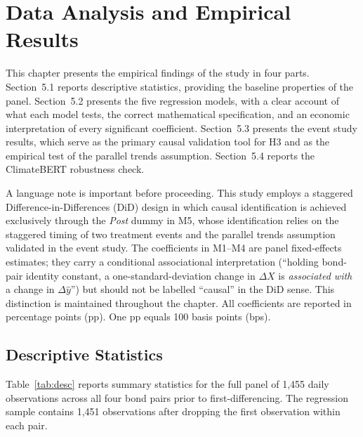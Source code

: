 \documentclass[12pt,a4paper]{article}
\begin{document}

\setcounter{section}{4}
\section{Data Analysis and Empirical Results}

This chapter presents the empirical findings of the study in four parts. Section~5.1 reports descriptive statistics, providing the baseline properties of the panel. Section~5.2 presents the five regression models, with a clear account of what each model tests, the correct mathematical specification, and an economic interpretation of every significant coefficient. Section~5.3 presents the event study results, which serve as the primary causal validation tool for H3 and as the empirical test of the parallel trends assumption. Section~5.4 reports the ClimateBERT robustness check.

A language note is important before proceeding. This study employs a staggered Difference-in-Differences (DiD) design in which causal identification is achieved exclusively through the \textit{Post} dummy in M5, whose identification relies on the staggered timing of two treatment events and the parallel trends assumption validated in the event study. The coefficients in M1--M4 are panel fixed-effects estimates; they carry a conditional associational interpretation (``holding bond-pair identity constant, a one-standard-deviation change in $\Delta X$ is \textit{associated with} a change in $\Delta\hat{y}$'') but should not be labelled ``causal'' in the DiD sense. This distinction is maintained throughout the chapter. All coefficients are reported in percentage points (pp). One pp equals 100 basis points (bps).

\subsection{Descriptive Statistics}

Table~\ref{tab:desc} reports summary statistics for the full panel of 1,455 daily observations across all four bond pairs prior to first-differencing. The regression sample contains 1,451 observations after dropping the first observation within each pair.
\end{document}
